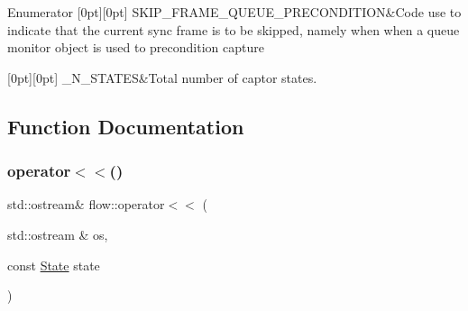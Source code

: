 \begin{DoxyEnumFields}{Enumerator}
[0pt][0pt]{}\mbox{\label{namespaceflow_adefe9726e597eb50c46f0f6a202018e9a553bb3189571a5b09c1d53c315abd8f8}} 
S\+K\+I\+P\+\_\+\+F\+R\+A\+M\+E\+\_\+\+Q\+U\+E\+U\+E\+\_\+\+P\+R\+E\+C\+O\+N\+D\+I\+T\+I\+ON&Code use to indicate that the current sync frame is to be skipped, namely when when a queue monitor object is used to precondition capture \\
\hline

[0pt][0pt]{}\mbox{\label{namespaceflow_adefe9726e597eb50c46f0f6a202018e9a63b87258ef5b5f3ccdfd68f9e673d66d}} 
\+\_\+\+N\+\_\+\+S\+T\+A\+T\+ES&Total number of captor states. \\
\hline

\end{DoxyEnumFields}


\subsection{Function Documentation}
\mbox{\label{namespaceflow_add94bf5b887f5f969dd2988fdf0673d9}} 
\subsubsection{\texorpdfstring{operator$<$$<$()}{operator<<()}\hspace{0.1cm}{\footnotesize\ttfamily [1/4]}}
{\footnotesize\ttfamily std\+::ostream\& flow\+::operator$<$$<$ (\begin{DoxyParamCaption}\item[{std\+::ostream \&}]{os,  }\item[{const \hyperlink{namespaceflow_adefe9726e597eb50c46f0f6a202018e9}{State}}]{state }\end{DoxyParamCaption})\hspace{0.3cm}{\ttfamily [inline]}}



